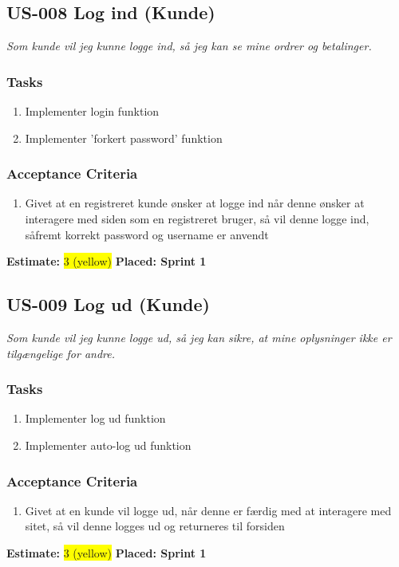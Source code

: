 \subsection{US-008 Log ind (Kunde)}
\label{sec:US-008}
\textit{Som kunde vil jeg kunne logge ind, så jeg kan se mine ordrer og betalinger.}
\subsubsection*{\textbf{Tasks}}
\begin{enumerate}
  \item Implementer login funktion
  \item Implementer 'forkert password' funktion
\end{enumerate}
\subsubsection*{\textbf{Acceptance Criteria}}
\begin{enumerate}
  \item Givet at en registreret kunde ønsker at logge ind når denne ønsker at interagere med siden som en registreret bruger, så vil denne logge ind, såfremt korrekt password og username er anvendt
\end{enumerate}
\textbf{Estimate:} \colorbox{yellow}{3 (yellow)}
\textbf{Placed: Sprint 1}
\par\noindent\dotfill

\subsection{US-009 Log ud (Kunde)}
\label{sec:US-009}
\textit{Som kunde vil jeg kunne logge ud, så jeg kan sikre, at mine oplysninger ikke er tilgængelige for andre.}
\subsubsection*{\textbf{Tasks}}
\begin{enumerate}
  \item Implementer log ud funktion
  \item Implementer auto-log ud funktion
\end{enumerate}
\subsubsection*{\textbf{Acceptance Criteria}}
\begin{enumerate}
  \item Givet at en kunde vil logge ud, når denne er færdig med at interagere med sitet, så vil denne logges ud og returneres til forsiden
\end{enumerate}
\textbf{Estimate:} \colorbox{yellow}{3 (yellow)}
\textbf{Placed: Sprint 1}
\par\noindent\dotfill

